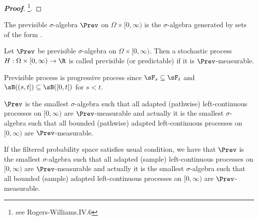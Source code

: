 \begin{proof}[\bf Proof]
\footnote{see Rogers-Williams\cite{Rogers_1994}.IV.6}.
\end{proof}

\begin{definition}\label{def:previsible_sigma_algebra_with_zero}
The previsible $\sigma$-algebra $\Prev$ on $\Omega \times [0,\infty)$ is the $\sigma$-algebra generated by sets of the form
\be
\bra{E \times(s, t]: E \in \sF_s, s < t} \cup {}.
\ee%
\end{definition}

\begin{definition}\label{def:previsible_process_continuous_without_zero}
Let $\Prev$ be previsible $\sigma$-algebra on $\Omega \times [0,\infty)$. Then a stochastic process $H: \Omega \times [0,\infty) \to \R$ is called previsible (or predictable) if it is $\Prev$-measurable.%
\end{definition}

\begin{remark}
Previsible process is progressive process since $\sF_s\subseteq \sF_t$ and $\sB((s,t])\subseteq \sB([0,t])$ for $s<t$.
\end{remark}



\begin{theorem}\label{thm:previsible_sigma_algebra_contains_all_adapted_left_continuous_process}
$\Prev$ is the smallest $\sigma$-algebra such that all adapted (pathwise) left-continuous processes on $[0,\infty)$ are $\Prev$-measurable and actually it is the smallest $\sigma$-algebra such that all bounded (pathwise) adapted left-continuous processes on $[0,\infty)$ are $\Prev$-measurable.%

If the filtered probability space satisfies usual condition, we have that $\Prev$ is the smallest $\sigma$-algebra such that all adapted (sample) left-continuous processes on $[0,\infty)$ are $\Prev$-measurable and actually it is the smallest $\sigma$-algebra such that all bounded (sample) adapted left-continuous processes on $[0,\infty)$ are $\Prev$-measurable.%
\end{theorem}

